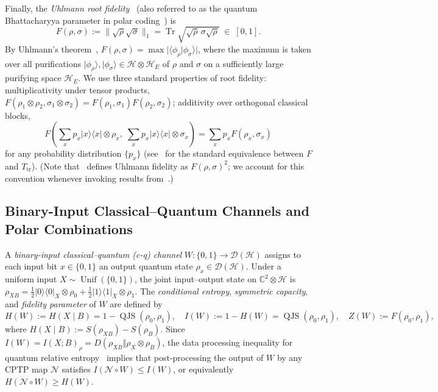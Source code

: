 \documentclass[10pt,a4paper]{article}
\numberwithin{equation}{section}
\theoremstyle{plain}
\theoremstyle{definition}
\theoremstyle{remark}
\DeclareMathOperator{\Tr}{Tr}
\DeclareMathOperator{\QJS}{QJS}
\DeclareMathOperator{\Unif}{Unif}
\newcommand{\cH}{\mathcal{H}}
\newcommand{\cD}{\mathcal{D}}
\newcommand{\cN}{\mathcal{N}}
\newcommand{\bC}{\mathbb{C}}
\newcommand{\ket}[1]{\lvert #1 \rangle}
\newcommand{\ketbra}[1]{\lvert #1 \rangle\langle #1 \rvert}
\newcommand{\braket}[2]{\langle #1 \vert #2 \rangle}
\begin{document}
Finally, the \emph{Uhlmann root fidelity}~\cite{Uhlmann1976} (also referred to as the quantum Bhattacharyya parameter in polar coding~\cite{WildeGuha2013}) is
\[
F(\rho, \sigma) := \lVert \sqrt{\rho}\sqrt{\sigma} \rVert_1 = \Tr \sqrt{\sqrt{\rho}\,\sigma\sqrt{\rho}} \;\in\; [0,1].
\]
By Uhlmann's theorem~\cite{Uhlmann1976}, $F(\rho, \sigma) = \max \lvert \braket{\phi_\rho}{\phi_\sigma} \rvert$, where the maximum is taken over all purifications $\ket{\phi_\rho}, \ket{\phi_\sigma} \in \cH \otimes \cH_E$ of $\rho$ and $\sigma$ on a sufficiently large purifying space $\cH_E$. We use three standard properties of root fidelity: multiplicativity under tensor products, $F(\rho_1 \otimes \rho_2, \sigma_1 \otimes \sigma_2) = F(\rho_1, \sigma_1) F(\rho_2, \sigma_2)$; additivity over orthogonal classical blocks,
\[
F\!\left(\sum_x p_x \ketbra{x} \otimes \rho_x,\; \sum_x p_x \ketbra{x} \otimes \sigma_x\right) = \sum_x p_x F(\rho_x, \sigma_x)
\]
for any probability distribution $\{p_x\}$ (see~\cite{FuchsVanDeGraaf1999} for the standard equivalence between $F$ and $T_{\mathrm{tr}}$).
(Note that~\cite{WildeGuha2013} defines Uhlmann fidelity as $F(\rho,\sigma)^2$; we account for this convention whenever invoking results from~\cite{WildeGuha2013}.)

\subsection{Binary-Input Classical--Quantum Channels and Polar Combinations}

A \emph{binary-input classical--quantum (c-q) channel} $W : \{0,1\} \to \cD(\cH)$ assigns to each input bit $x \in \{0,1\}$ an output quantum state $\rho_x \in \cD(\cH)$. Under a uniform input $X \sim \Unif(\{0,1\})$, the joint input--output state on $\bC^2 \otimes \cH$ is $\rho_{XB} = \frac{1}{2}\ketbra{0}_X \otimes \rho_0 + \frac{1}{2}\ketbra{1}_X \otimes \rho_1$. The \emph{conditional entropy}, \emph{symmetric capacity}, and \emph{fidelity parameter} of $W$ are defined by
\begin{equation}\label{eq:channel-params}
H(W) := H(X \mid B) = 1 - \QJS(\rho_0, \rho_1), \quad
I(W) := 1 - H(W) = \QJS(\rho_0, \rho_1), \quad
Z(W) := F(\rho_0, \rho_1),
\end{equation}
where $H(X \mid B) := S(\rho_{XB}) - S(\rho_B)$. Since $I(W) = I(X; B)_{\rho} = D(\rho_{XB} \Vert \rho_X \otimes \rho_B)$, the data processing inequality for quantum relative entropy~\cite{Lindblad1975} implies that post-processing the output of $W$ by any CPTP map $\cN$ satisfies $I(\cN \circ W) \le I(W)$, or equivalently $H(\cN \circ W) \ge H(W)$.
\end{document}
